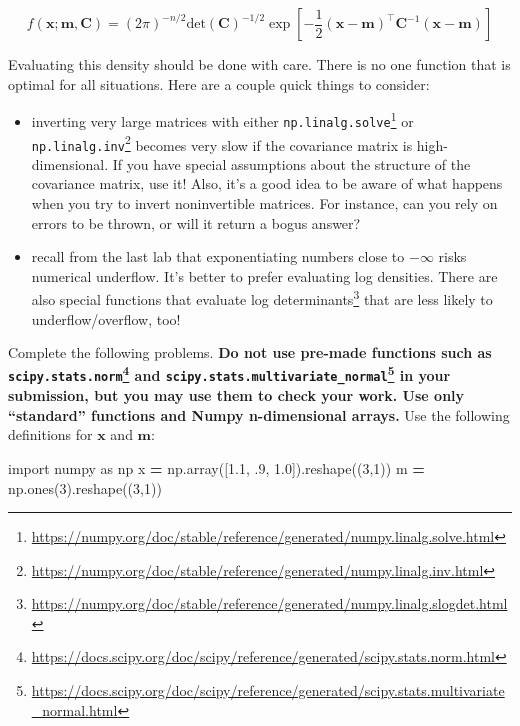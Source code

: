 \documentclass[
  12pt,
  krantz2]{krantz}
\makeatletter
\newenvironment{Shaded}{\begin{snugshade}}{\end{snugshade}}
\newcommand{\DecValTok}[1]{\textcolor[rgb]{0.06,0.06,0.06}{#1}}
\newcommand{\FloatTok}[1]{\textcolor[rgb]{0.06,0.06,0.06}{#1}}
\newcommand{\ImportTok}[1]{#1}
\newcommand{\NormalTok}[1]{#1}
\newcommand{\OperatorTok}[1]{\textcolor[rgb]{0.43,0.43,0.43}{\textbf{#1}}}
\renewcommand{\href}[2]{#2\footnote{\url{#1}}}
\newenvironment{kframe}{%
\medskip{}
\setlength{\fboxsep}{.8em}
 \def\at@end@of@kframe{}%
 \ifinner\ifhmode%
  \def\at@end@of@kframe{\end{minipage}}%
  \begin{minipage}{\columnwidth}%
 \fi\fi%
 \def\FrameCommand##1{\hskip\@totalleftmargin \hskip-\fboxsep
 \colorbox{shadecolor}{##1}\hskip-\fboxsep
     \hskip-\linewidth \hskip-\@totalleftmargin \hskip\columnwidth}%
 \MakeFramed {\advance\hsize-\width
   \@totalleftmargin\z@ \linewidth\hsize
   \@setminipage}}%
 {\par\unskip\endMakeFramed%
 \at@end@of@kframe}
\renewenvironment{Shaded}{\begin{kframe}}{\end{kframe}}
\makeatother
\begin{document}
\begin{equation} 
f(\mathbf{x}; \mathbf{m}, \mathbf{C}) = (2\pi)^{-n/2}\text{det}\left( \mathbf{C} \right)^{-1/2}\exp\left[- \frac{1}{2} (\mathbf{x}- \mathbf{m})^\intercal \mathbf{C}^{-1} (\mathbf{x}- \mathbf{m}) \right]
\end{equation}

Evaluating this density should be done with care. There is no one function that is optimal for all situations. Here are a couple quick things to consider:

\begin{itemize}
\item
  inverting very large matrices with either \href{https://numpy.org/doc/stable/reference/generated/numpy.linalg.solve.html}{\texttt{np.linalg.solve}} or \href{https://numpy.org/doc/stable/reference/generated/numpy.linalg.inv.html}{\texttt{np.linalg.inv}} becomes very slow if the covariance matrix is high-dimensional. If you have special assumptions about the structure of the covariance matrix, use it! Also, it's a good idea to be aware of what happens when you try to invert noninvertible matrices. For instance, can you rely on errors to be thrown, or will it return a bogus answer?
\item
  recall from the last lab that exponentiating numbers close to \(-\infty\) risks numerical underflow. It's better to prefer evaluating log densities. There are also \href{https://numpy.org/doc/stable/reference/generated/numpy.linalg.slogdet.html}{special functions that evaluate log determinants} that are less likely to underflow/overflow, too!
\end{itemize}

Complete the following problems. \textbf{Do not use pre-made functions such as \href{https://docs.scipy.org/doc/scipy/reference/generated/scipy.stats.norm.html}{\texttt{scipy.stats.norm}} and \href{https://docs.scipy.org/doc/scipy/reference/generated/scipy.stats.multivariate_normal.html}{\texttt{scipy.stats.multivariate\_normal}} in your submission, but you may use them to check your work. Use only ``standard'' functions and Numpy n-dimensional arrays.} Use the following definitions for \(\mathbf{x}\) and \(\mathbf{m}\):

\begin{Shaded}
\begin{Highlighting}[]
\ImportTok{import}\NormalTok{ numpy }\ImportTok{as}\NormalTok{ np}
\NormalTok{x }\OperatorTok{=}\NormalTok{ np.array([}\FloatTok{1.1}\NormalTok{, }\FloatTok{.9}\NormalTok{, }\FloatTok{1.0}\NormalTok{]).reshape((}\DecValTok{3}\NormalTok{,}\DecValTok{1}\NormalTok{))}
\NormalTok{m }\OperatorTok{=}\NormalTok{ np.ones(}\DecValTok{3}\NormalTok{).reshape((}\DecValTok{3}\NormalTok{,}\DecValTok{1}\NormalTok{))}
\end{Highlighting}
\end{Shaded}
\end{document}

